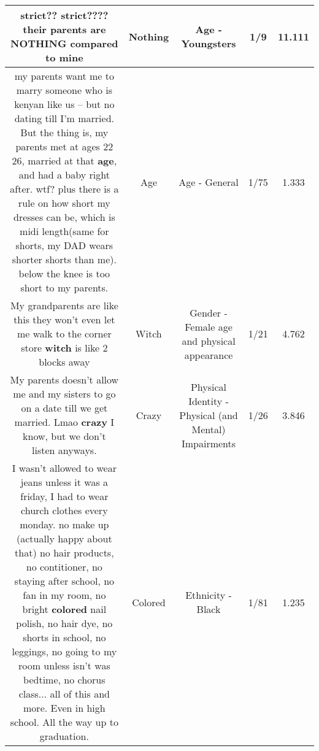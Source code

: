 \documentclass[11pt]{article}
\newlength\mylength
\begin{document}
\begin{center}
\begin{longtable}{|C{.65\mylength}|C{.30\mylength}|C{.12\mylength}|C{.12\mylength}|C{.12\mylength}|}
  \small strict?? strict???? their parents are \textbf{NOTHING} compared to mine\normalsize   & Nothing & Age - Youngsters & 1/9 & 11.111 \\  \hline
  \small my parents want me to marry someone who is kenyan like us -- but no dating till I'm married. But the thing is, my parents met at ages 22 26, married at that \textbf{age}, and had a baby right after. wtf? plus there is a rule on how short my dresses can be, which is midi length(same for shorts, my DAD wears shorter shorts than me). below the knee is too short to my parents.\normalsize   & Age & Age - General & 1/75 & 1.333 \\  \hline
  \small My grandparents are like this they won't even let me walk to the corner store \textbf{witch} is like 2 blocks away\normalsize   & Witch & Gender - Female age and physical appearance & 1/21 & 4.762 \\  \hline
  \small My parents doesn't allow me and my sisters to go on a date till we get married. Lmao \textbf{crazy} I know, but we don't listen anyways.\normalsize   & Crazy & Physical Identity - Physical (and Mental) Impairments & 1/26 & 3.846 \\  \hline
  \small I wasn't allowed to wear jeans unless it was a friday, I had to wear church clothes every monday. no make up (actually happy about that) no hair products, no contitioner, no staying after school, no fan in my room, no bright \textbf{colored} nail polish, no hair dye, no shorts in school, no leggings, no going to my room unless isn't was bedtime, no chorus class... all of this and more. Even in high school. All the way up to graduation.\normalsize   & Colored & Ethnicity - Black & 1/81 & 1.235 \\  \hline

\end{longtable}
\end{center}
\end{document}
